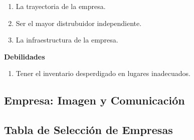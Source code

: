 \documentclass[a4paper,10pt,titlepage]{article}
\begin{document}
\begin{enumerate}
    \begin{enumerate}
      \item La trayectoria de la empresa.
      \item Ser el mayor distrubuidor independiente.
      \item La infraestructura de la empresa.
     \end{enumerate}  
    \textbf{Debilidades} \\ 
   \begin{enumerate}
     \item Tener el inventario desperdigado en lugares inadecuados.
  
   \end{enumerate} 
\end{enumerate}

\newpage
\vspace*{\fill}
\begin{center}
\begingroup
\titlerule
\vspace{1cm}
\section{Empresa: Imagen y Comunicaci\'on}
\vspace{1cm}
\titlerule
\endgroup
\end{center}
\vspace*{\fill}

\newpage

\subsection{Tabla de Selecci\'on de Empresas}
\end{document}
